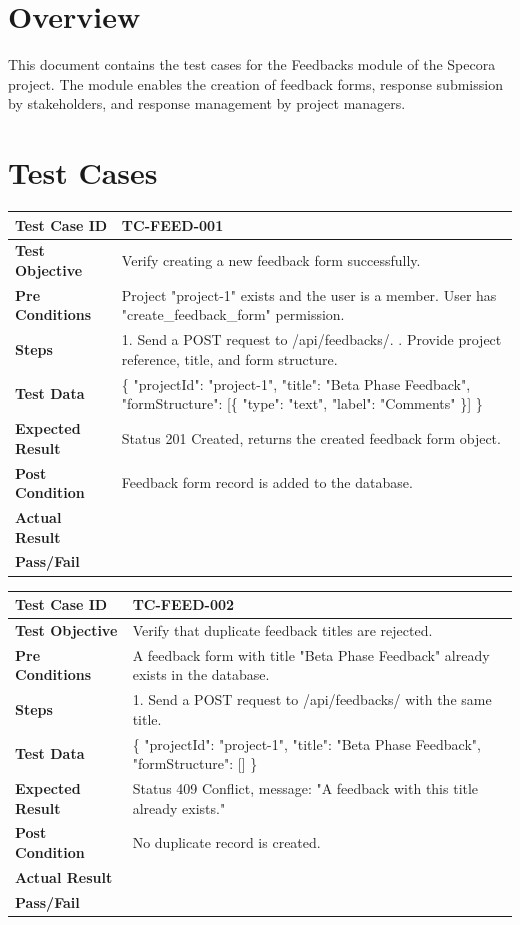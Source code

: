 \section{Overview}
This document contains the test cases for the Feedbacks module of the Specora project. The module enables the creation of feedback forms, response submission by stakeholders, and response management by project managers.

\section{Test Cases}

\begin{longtable}{|p{}|p{}|}
\hline
\textbf{Test Case ID} & TC-FEED-001 \\ \hline
\textbf{Test Objective} & Verify creating a new feedback form successfully. \\ \hline
\textbf{Pre Conditions} & Project "project-1" exists and the user is a member. User has "create_feedback_form" permission. \\ \hline
\textbf{Steps} & 
1. Send a POST request to /api/feedbacks/. \newline
2. Provide project reference, title, and form structure. \\ \hline
\textbf{Test Data} & \{ "projectId": "project-1", "title": "Beta Phase Feedback", "formStructure": [\{ "type": "text", "label": "Comments" \}] \} \\ \hline
\textbf{Expected Result} & Status 201 Created, returns the created feedback form object. \\ \hline
\textbf{Post Condition} & Feedback form record is added to the database. \\ \hline
\textbf{Actual Result} &  \\ \hline
\textbf{Pass/Fail} &  \\ \hline
\end{longtable}

\begin{longtable}{|p{}|p{}|}
\hline
\textbf{Test Case ID} & TC-FEED-002 \\ \hline
\textbf{Test Objective} & Verify that duplicate feedback titles are rejected. \\ \hline
\textbf{Pre Conditions} & A feedback form with title "Beta Phase Feedback" already exists in the database. \\ \hline
\textbf{Steps} & 
1. Send a POST request to /api/feedbacks/ with the same title. \\ \hline
\textbf{Test Data} & \{ "projectId": "project-1", "title": "Beta Phase Feedback", "formStructure": [] \} \\ \hline
\textbf{Expected Result} & Status 409 Conflict, message: "A feedback with this title already exists." \\ \hline
\textbf{Post Condition} & No duplicate record is created. \\ \hline
\textbf{Actual Result} &  \\ \hline
\textbf{Pass/Fail} &  \\ \hline
\end{longtable}

